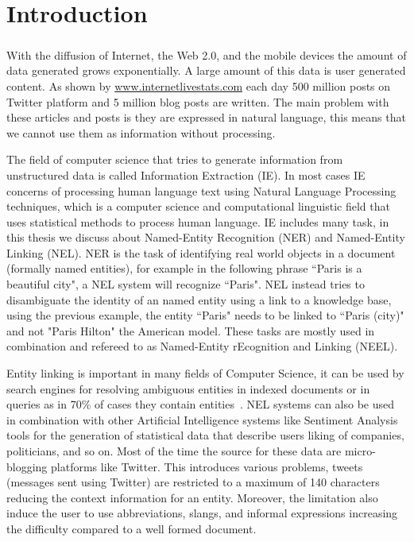 \chapter{Introduction}
\paragraph{}
With the diffusion of Internet, the Web 2.0, and the mobile devices the amount of data generated grows exponentially. A large amount of this data is user generated content. As shown by \href{http://www.internetlivestats.com/}{www.internetlivestats.com} each day 500 million posts on Twitter platform and 5 million blog posts are written. The main problem with these articles and posts is they are expressed in natural language, this means that we cannot use them as information without processing.

The field of computer science that tries to generate information from unstructured data is called Information Extraction (IE). In most cases IE concerns of processing human language text using Natural Language Processing techniques, which is a computer science and computational linguistic field that uses statistical methods to process human language. IE includes many task, in this thesis we discuss about Named-Entity Recognition (NER) and Named-Entity Linking (NEL). NER is the task of identifying real world objects in a document (formally named entities), for example in the following phrase ``Paris is a beautiful city", a NEL system will recognize ``Paris". NEL instead tries to disambiguate the identity of an named entity using a link to a knowledge base, using the previous example, the entity ``Paris" needs to be linked to ``Paris (city)" and not "Paris Hilton" the American model.  These tasks are mostly used in combination and refereed to as Named-Entity rEcognition and Linking (NEEL). 

Entity linking is important in many fields of Computer Science, it can be used by search engines for resolving ambiguous entities in indexed documents or in queries as in 70\% of cases they contain entities~\cite{pound2010ad}. NEL systems can also be used in combination with other Artificial Intelligence systems like Sentiment Analysis tools for the generation of statistical data that describe users liking of companies, politicians, and so on. Most of the time the source for these data are micro-blogging platforms like Twitter. This introduces various problems, tweets (messages sent using Twitter) are restricted to a maximum of 140 characters reducing the context information for an entity. Moreover, the limitation also induce the user to use abbreviations, slangs, and informal expressions increasing the difficulty compared to a well formed document.


